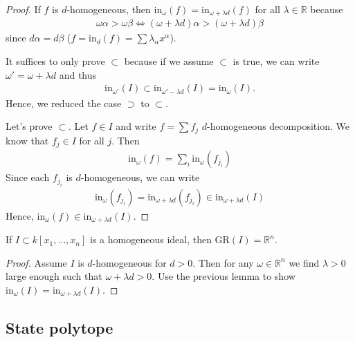 \documentclass[a4paper, 11pt]{article}
\begin{document}
\begin{proof}
  If \( f \) is \( d \)-homogeneous, then \( \mathrm{in}_\omega(f) = \mathrm{in}_{\omega + \lambda d}(f)  \) for all \( \lambda \in \mathbb R \) because 
  \begin{align*}
    \omega \alpha > \omega \beta \iff (\omega + \lambda d)\alpha > (\omega + \lambda d)\beta
  \end{align*}
  since \( d\alpha = d\beta \) (\( f = \mathrm{in}_d (f) = \sum \lambda_\alpha x^\alpha \)).

  It suffices to only prove \( \subset \) because if we assume \( \subset \) is true, we can write \( \omega' = \omega + \lambda d \) and thus 
  \begin{align*}
    \mathrm{in}_{\omega'}(I) \subset \mathrm{in}_{\omega' - \lambda d}(I) = \mathrm{in}_\omega(I).
  \end{align*}
  Hence, we reduced the case \( \supset \) to \( \subset \).

  Let's prove \( \subset \). Let \( f \in I \) and write \( f = \sum f_j \) \( d \)-homogeneous decomposition. We know that \( f_j \in I \) for all \( j \). Then 
  \begin{align*}
    \mathrm{in}_\omega(f) =  \sum_{i} \mathrm{in}_\omega(f_{j_i})
  \end{align*}
  Since each \( f_{j_i} \) is \( d \)-homogeneous, we can write 
  \begin{align*}
    \mathrm{in}_\omega(f_{j_i}) = \mathrm{in}_{\omega + \lambda d}(f_{j_i}) \in \mathrm{in}_{\omega + \lambda d}(I)
  \end{align*}
  Hence, \( \mathrm{in}_\omega(f) \in \mathrm{in}_{\omega + \lambda d}(I) \).
\end{proof}


\begin{cor}
  If \( I \subset k[x_1, \dots, x_n] \) is a homogeneous ideal, then \( \mathrm{GR}(I) = \mathbb R^n \).
\end{cor}

\begin{proof}
  Assume \( I \) is \( d \)-homogeneous for \( d > 0 \). Then for any \( \omega \in \mathbb R^n \) we find \( \lambda > 0  \) large enough such that \( \omega + \lambda d > 0 \). Use the previous lemma to show \( \mathrm{in}_\omega(I) = \mathrm{in}_{\omega + \lambda d}(I) \).
\end{proof}



\subsection{State polytope}
\end{document}
